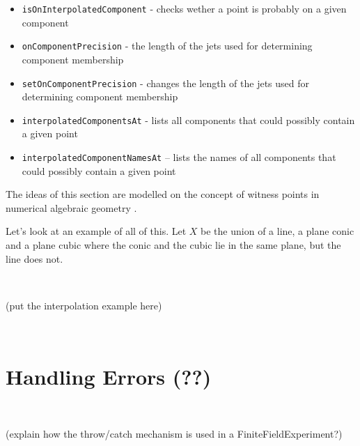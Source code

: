 \documentclass[12pt,a4paper]{amsart}
\theoremstyle{plain}
\theoremstyle{definition}
\begin{document}
\begin{itemize}
\item {\tt isOnInterpolatedComponent} - checks wether a point is probably on a given component
\item {\tt onComponentPrecision} - the length of the jets used for determining component membership
\item {\tt setOnComponentPrecision} - changes the length of the jets used for determining component membership
\item {\tt interpolatedComponentsAt} - lists all components that could possibly contain a given point
\item {\tt interpolatedComponentNamesAt} -- lists the names of all components that could possibly contain a given point
\end{itemize}

The ideas of this section are modelled on the concept of witness points in numerical algebraic geometry \cite{??}.

Let's look at an example of all of this. Let $X$ be the union of a line, a plane conic and a plane cubic where the conic and the cubic lie in the same plane, but the line does not. 

\

{\color{red} (put the interpolation example here)}

\

\section{Handling Errors {\color{red} (??)}}

\

{\color{red} (explain how the throw/catch mechanism is used in a FiniteFieldExperiment?)}

\
\end{document}
